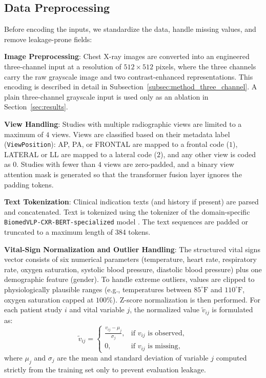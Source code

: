 \subsection{Data Preprocessing}
\label{subsec:method_preprocessing}

Before encoding the inputs, we standardize the data, handle missing values, and remove leakage-prone fields:

\textbf{Image Preprocessing}: Chest X-ray images are converted into an engineered three-channel input at a resolution of $512 \times 512$ pixels, where the three channels carry the raw grayscale image and two contrast-enhanced representations. This encoding is described in detail in Subsection~\ref{subsec:method_three_channel}. A plain three-channel grayscale input is used only as an ablation in Section~\ref{sec:results}.

\textbf{View Handling}: Studies with multiple radiographic views are limited to a maximum of $4$ views. Views are classified based on their metadata label (\texttt{ViewPosition}): AP, PA, or FRONTAL are mapped to a frontal code ($1$), LATERAL or LL are mapped to a lateral code ($2$), and any other view is coded as $0$. Studies with fewer than $4$ views are zero-padded, and a binary view attention mask is generated so that the transformer fusion layer ignores the padding tokens.

\textbf{Text Tokenization}: Clinical indication texts (and history if present) are parsed and concatenated. Text is tokenized using the tokenizer of the domain-specific \texttt{BiomedVLP-CXR-BERT-}\-\texttt{specialized} model \cite{boecking2022biovil}. The text sequences are padded or truncated to a maximum length of 384 tokens.

\textbf{Vital-Sign Normalization and Outlier Handling}: The structured vital signs vector consists of six numerical parameters (temperature, heart rate, respiratory rate, oxygen saturation, systolic blood pressure, diastolic blood pressure) plus one demographic feature (gender). To handle extreme outliers, values are clipped to physiologically plausible ranges (e.g., temperatures between $85^\circ\text{F}$ and $110^\circ\text{F}$, oxygen saturation capped at $100\%$). Z-score normalization is then performed. For each patient study \(i\) and vital variable \(j\), the normalized value \(\tilde{v}_{ij}\) is formulated as:
\begin{equation}
    \tilde{v}_{ij} =
    \begin{cases}
        \frac{v_{ij} - \mu_j}{\sigma_j}, & \text{if } v_{ij} \text{ is observed}, \\
        0, & \text{if } v_{ij} \text{ is missing},
    \end{cases}
\end{equation}
where \(\mu_j\) and \(\sigma_j\) are the mean and standard deviation of variable \(j\) computed strictly from the training set only to prevent evaluation leakage.

